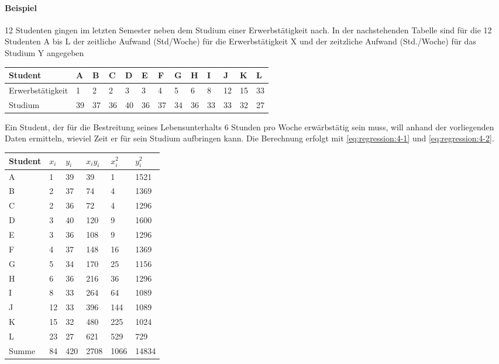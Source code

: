 \paragraph{Beispiel} 12 Studenten gingen im letzten Semester neben dem Studium einer Erwerbstätigkeit nach. In der nachstehenden Tabelle sind für die 12 Studenten A bis L der zeitliche Aufwand (Std/Woche) für die Erwerbstätigkeit X und der zeitzliche Aufwand (Std./Woche) für das Studium Y angegeben
\smallskip
\begin{table}[H]
\centering
\begin{tabular}{@{}lllllllllllll@{}}
\toprule
Student & A & B & C & D & E & F & G & H & I & J & K & L \\ \midrule
Erwerbstätigkeit & 1 & 2 & 2 & 3 & 3 & 4 & 5 & 6 & 8 & 12 & 15 & 33 \\
Studium & 39 & 37 & 36 & 40 & 36 & 37 & 34 & 36 & 33 & 33 & 32 & 27 \\ \bottomrule
\end{tabular}
\end{table}
Ein Student, der für die Bestreitung seines Lebensunterhalts 6 Stunden pro Woche erwärbstätig sein muss, will anhand der vorliegenden Daten ermitteln, wieviel Zeit er für sein Studium aufbringen kann. Die Berechnung erfolgt mit \autoref{eq:regression:4-1} und \autoref{eq:regression:4-2}.
\begin{table}[H]
\centering
\begin{tabular}{@{}llllll@{}}
\toprule
Student & $x_i$ & $y_i$ & $x_i y_i$ & $x_i^2$ & $y_i^2$ \\ \midrule
A & 1 & 39 & 39 & 1 & 1521 \\
B & 2 & 37 & 74 & 4 & 1369 \\
C & 2 & 36 & 72 & 4 & 1296 \\
D & 3 & 40 & 120 & 9 & 1600 \\
E & 3 & 36 & 108 & 9 & 1296 \\
F & 4 & 37 & 148 & 16 & 1369 \\
G & 5 & 34 & 170 & 25 & 1156 \\
H & 6 & 36 & 216 & 36 & 1296 \\
I & 8 & 33 & 264 & 64 & 1089 \\
J & 12 & 33 & 396 & 144 & 1089 \\
K & 15 & 32 & 480 & 225 & 1024 \\
L & 23 & 27 & 621 & 529 & 729 \\
Summe & 84 & 420 & 2708 & 1066 & 14834 \\ \bottomrule
\end{tabular}
\end{table}
